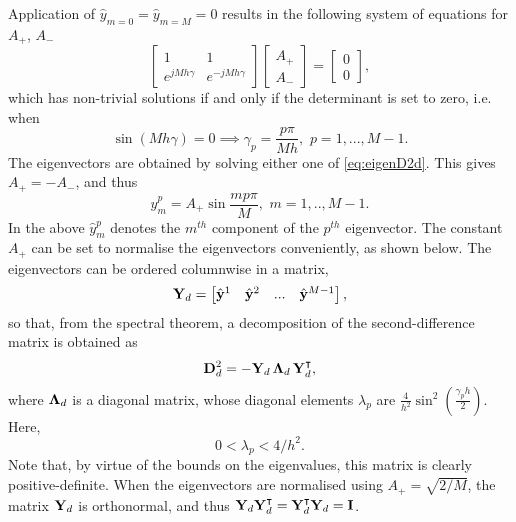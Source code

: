 Application of ${\hat{y}}_{m=0}={\hat{y}}_{m=M}=0$ results in the following system of equations for $A_+$, $A_-$
\begin{equation}\label{eq:eigenD2d}
\begin{bmatrix}
1 & 1 \\
e^{jMh\gamma} & e^{-jMh\gamma}
\end{bmatrix}
\begin{bmatrix}
A_+ \\
A_-
\end{bmatrix}=
\begin{bmatrix}
0 \\
0
\end{bmatrix},
\end{equation}
which has non-trivial solutions if and only if the determinant is set to zero, i.e. when
\begin{equation}\label{eq:waveNrD2d}
\sin ({Mh\gamma}) = 0  \implies  \gamma_p = \frac{p \pi}{M h}, \,\, p = 1,...,M-1.
\end{equation}
The eigenvectors are obtained by solving either one of \eqref{eq:eigenD2d}. This gives $A_+=-A_-$, and thus
\begin{equation}\label{eq:EigenVecsD2d}
{\hat y}^p_m = A_+ \sin \frac{mp\pi}{M },\,\, m = 1,..,M-1.
\end{equation}
In the above $\hat{ y}^p_m$ denotes the $m^{th}$ component of the $p^{th}$ eigenvector. The constant $A_+$ can be set to normalise the eigenvectors conveniently, as shown below. 
The eigenvectors can be ordered columnwise in a matrix,
\begin{equation}
{\bf Y}_d = \begin{bmatrix}\hat {\bf y}^1 & \hat{\bf y}^2 & ... & \hat{\bf y}^{M-1}\end{bmatrix},
\end{equation}
so that, from the spectral theorem, a decomposition of the second-difference matrix is obtained as
\begin{equation}\label{eq:DecompD2d}
{\bf D}^{2}_d = -{\bf Y}_d \, {\bf \Lambda}_d \, {\bf Y}^\intercal_d,
\end{equation}
where ${{\bf \Lambda}_d}$ is a diagonal matrix, whose diagonal elements $\lambda_p$ are  $\frac{4}{h^2}\sin^2 \left( \frac{\gamma_p h}{2}\right)$. Here, 
\begin{equation}\label{eq:BndLambdaD2d}
0 < \lambda_p < 4/h^2.
\end{equation}
Note that, by virtue of the bounds on the eigenvalues, this matrix is clearly positive-definite. 
When the eigenvectors are normalised using $A_+ = \sqrt{2/M}$, the matrix ${\bf Y}_d$ is orthonormal, and thus ${\bf Y}_d {\bf Y}_d^{\intercal}={\bf Y}_d^\intercal {\bf Y}_d = {\bf I}$.


